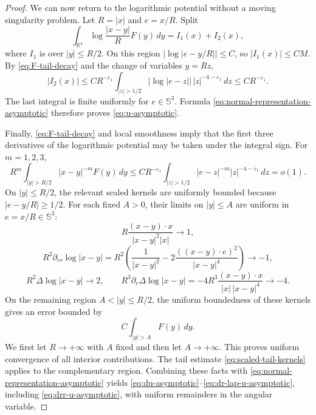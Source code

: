 \documentclass[10pt,a4paper]{amsart}
\begin{document}
\begin{proof}
We can now return to the logarithmic potential without a moving singularity problem. Let \(R=|x|\) and \(e=x/R\). Split
\[
\int_{\mathbb R^{4}}\log\frac{|x-y|}{R}F(y)\,dy
=I_{1}(x)+I_{2}(x),
\]
where \(I_1\) is over \(|y|\leq R/2\). On this region
\(|\log|e-y/R||\leq C\), so \(|I_1(x)|\leq CM\). By \eqref{eq:F-tail-decay} and the change of variables \(y=Rz\),
\[
|I_2(x)|
\leq C R^{-\varepsilon_{1}}
\int_{|z|>1/2}|\log|e-z||\,|z|^{-4-\varepsilon_{1}}\,dz
\leq C R^{-\varepsilon_{1}}.
\]
The last integral is finite uniformly for \(e\in\mathbb S^{3}\). Formula
\eqref{eq:normal-representation-asymptotic} therefore proves
\eqref{eq:u-asymptotic}.

Finally, \eqref{eq:F-tail-decay} and local smoothness imply that the first three derivatives of the logarithmic potential may be taken under the integral sign. For \(m=1,2,3\),
\begin{equation}\label{eq:scaled-tail-kernels}
R^{m}\int_{|y|>R/2}|x-y|^{-m}F(y)\,dy
\leq C R^{-\varepsilon_{1}}
\int_{|z|>1/2}|e-z|^{-m}|z|^{-4-\varepsilon_{1}}\,dz
=o(1).
\end{equation}
On \(|y|\leq R/2\), the relevant scaled kernels are uniformly bounded because
\(|e-y/R|\geq1/2\). For each fixed \(A>0\), their limits on \(|y|\leq A\)
are uniform in \(e=x/R\in\mathbb S^{3}\):
\[
R\frac{(x-y)\cdot x}{|x-y|^{2}|x|}\longrightarrow1,
\]
\[
R^{2}\partial_{rr}\log|x-y|
=R^{2}\left(
\frac{1}{|x-y|^{2}}
-2\frac{((x-y)\cdot e)^{2}}{|x-y|^{4}}
\right)\longrightarrow-1,
\]
\[
R^{2}\Delta\log|x-y|\longrightarrow2,
\qquad
R^{3}\partial_{r}\Delta\log|x-y|
=-4R^{3}\frac{(x-y)\cdot x}{|x|\,|x-y|^{4}}
\longrightarrow-4.
\]
On the remaining region \(A<|y|\leq R/2\), the uniform boundedness of these
kernels gives an error bounded by
\[
C\int_{|y|>A}F(y)\,dy.
\]
We first let \(R\to+\infty\) with \(A\) fixed and then let \(A\to+\infty\).
This proves uniform convergence of all interior contributions. The tail
estimate \eqref{eq:scaled-tail-kernels} applies to the complementary region.
Combining these facts with \eqref{eq:normal-representation-asymptotic} yields
\eqref{eq:du-asymptotic}--\eqref{eq:dr-lap-u-asymptotic}, including
\eqref{eq:drr-u-asymptotic}, with uniform remainders in the angular variable.
\end{proof}
\end{document}
